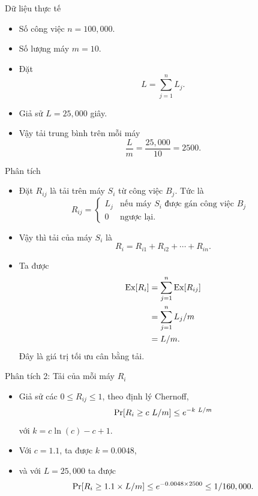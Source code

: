           \begin{frame}{Dữ liệu thực tế}
            \begin{itemize}
            \item Số công việc $n = 100,000$.
            \item Số lượng máy $m = 10$. 
            \item Đặt $$L = \sum_{j=1}^{n} L_j.$$
            \item Giả sử $L = 25,000$ giây.
              
            \item Vậy tải trung bình trên mỗi máy 
              \[
                \frac{L}{m} = \frac{25,000}{10} = 2500.
              \]  
            \end{itemize}
          \end{frame}
          \begin{frame}{Phân tích}
            \begin{itemize}
            \item Đặt $R_{ij} $ là tải trên  máy $S_i$ từ công việc $B_j$. Tức là 
              $$
              R_{ij} = \begin{cases}
                L_j &\text{nếu máy $S_i$ được gán công việc $B_j$ }\\
                0 & \text{ngược lại.}
              \end{cases} 
              $$
            \item Vậy thì tải của máy $S_i$ là $$R_i =  R_{i1} + R_{i2} + \cdots + R_{in}.$$
            \item Ta được 
              \begin{align*}
		\mathrm{Ex}[R_i] &= \sum_{j=1}^{n} \mathrm{Ex}[R_{ij}] \\
		         &= \sum_{j=1}^n L_j/m\\
                         &= L/m.
              \end{align*}
              Đây là giá trị tối ưu cân bằng tải.
            \end{itemize}
          \end{frame}

          \begin{frame}{Phân tích 2: Tải của mỗi máy $R_i$}
            \begin{itemize}
            \item 	Giả sử các $0\leq R_{ij}\leq 1$, theo định lý Chernoff,
              \[
		\mathrm{Pr}[R_i \geq c\ L/m] \leq e^{-k\ L/m}
              \]
              với $k = c \ln(c) - c + 1$.
              
              
            \item Với $c = 1.1$, ta được $k = 0.0048$,
            \item và với  $L = 25,000$ ta được
              \[
		\mathrm{Pr}[R_i \geq 1.1\times L/m] \leq e^{-0.0048\times 2500} \leq 1/160,000.
              \]
            \end{itemize}
          \end{frame}

